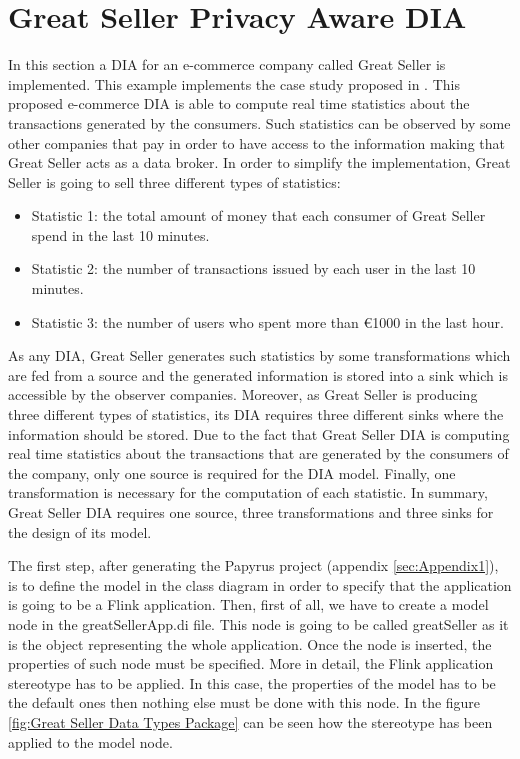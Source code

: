 \section{Great Seller Privacy Aware DIA}

In this section a DIA for an e-commerce company called Great Seller is implemented. This example implements the case study proposed in \cite{privacypoliciesarticle}. This proposed e-commerce DIA is able to compute real time statistics about the transactions generated by the consumers. Such statistics can be observed by some other companies that pay in order to have access to the information making that Great Seller acts as a data broker. In order to simplify the implementation, Great Seller is going to sell three different types of statistics:

\begin{itemize}

\item Statistic 1: the total amount of money that each consumer of Great Seller spend in the last 10 minutes.
\item Statistic 2: the number of transactions issued by each user in the last 10 minutes.
\item Statistic 3: the number of users who spent more than \euro{1000} in the last hour.

\end{itemize}

As any DIA, Great Seller generates such statistics by some transformations which are fed from a source and the generated information is stored into a sink which is accessible by the observer companies. Moreover, as Great Seller is producing three different types of statistics, its DIA requires three different sinks where the information should be stored. Due to the fact that Great Seller DIA is computing real time statistics about the transactions that are generated by the consumers of the company, only one source is required for the DIA model. Finally, one transformation is necessary for the computation of each statistic. In summary, Great Seller DIA requires one source, three transformations and three sinks for the design of its model.

The first step, after generating the Papyrus project (appendix \ref{sec:Appendix1}), is to define the model in the class diagram in order to specify that the application is going to be a Flink application. Then, first of all, we have to create a model node in the greatSellerApp.di file. This node is going to be called greatSeller as it is the object representing the whole application. Once the node is inserted, the properties of such node must be specified. More in detail, the Flink application stereotype has to be applied. In this case, the properties of the model has to be the default ones then nothing else must be done with this node. In the figure \ref{fig:Great Seller Data Types Package} can be seen how the stereotype has been applied to the model node.

